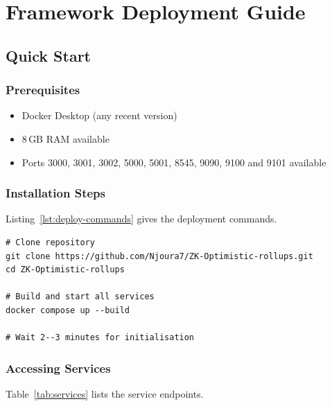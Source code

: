 \chapter{Framework Deployment Guide}
\label{app:deployment}

\section{Quick Start}

\subsection{Prerequisites}

\begin{itemize}
    \item Docker Desktop (any recent version)
    \item 8\,GB RAM available
    \item Ports 3000, 3001, 3002, 5000, 5001, 8545, 9090, 9100 and 9101 available
\end{itemize}

\subsection{Installation Steps}

Listing~\ref{lst:deploy-commands} gives the deployment commands.

\begin{listing}[H]
    \begin{verbatim}
# Clone repository
git clone https://github.com/Njoura7/ZK-Optimistic-rollups.git
cd ZK-Optimistic-rollups

# Build and start all services
docker compose up --build

# Wait 2--3 minutes for initialisation
    \end{verbatim}
    \caption{Basic deployment commands}
    \label{lst:deploy-commands}
\end{listing}

\subsection{Accessing Services}

Table~\ref{tab:services} lists the service endpoints.

